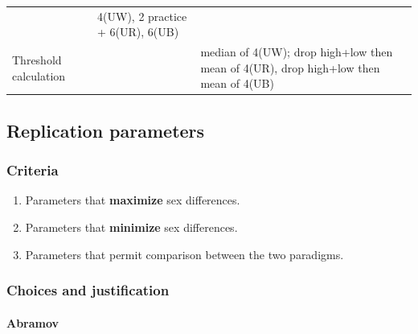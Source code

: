 \documentclass[]{article}
\providecommand{\tightlist}{%
  \setlength{\itemsep}{0pt}\setlength{\parskip}{0pt}}
\let\oldparagraph\paragraph
\renewcommand{\paragraph}[1]{\oldparagraph{#1}\mbox{}}
\begin{document}
\begin{longtable}[]{@{}lll@{}}
\begin{minipage}[t]{0.29\columnwidth}
\strut
\end{minipage} & \begin{minipage}[t]{0.26\columnwidth}\raggedright
4(UW), 2 practice + 6(UR), 6(UB)\strut
\end{minipage}\tabularnewline
\begin{minipage}[t]{0.36\columnwidth}\raggedright
Threshold calculation\strut
\end{minipage} & \begin{minipage}[t]{0.29\columnwidth}\raggedright
\strut
\end{minipage} & \begin{minipage}[t]{0.26\columnwidth}\raggedright
median of 4(UW); drop high+low then mean of 4(UR), drop high+low then
mean of 4(UB)\strut
\end{minipage}\tabularnewline
\bottomrule
\end{longtable}

\hypertarget{replication-parameters}{%
\subsection{Replication parameters}\label{replication-parameters}}

\hypertarget{criteria}{%
\subsubsection{Criteria}\label{criteria}}

\begin{enumerate}
\def\labelenumi{\arabic{enumi}.}
\tightlist
\item
  Parameters that \textbf{maximize} sex differences.
\item
  Parameters that \textbf{minimize} sex differences.
\item
  Parameters that permit comparison between the two paradigms.
\end{enumerate}

\hypertarget{choices-and-justification}{%
\subsubsection{Choices and
justification}\label{choices-and-justification}}

\hypertarget{abramov}{%
\paragraph{Abramov}\label{abramov}}
\end{document}
